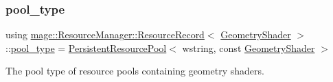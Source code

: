 \subsubsection{\texorpdfstring{pool\+\_\+type}{pool\_type}}
{\footnotesize\ttfamily using \hyperlink{structmage_1_1_resource_manager_1_1_resource_record}{mage\+::\+Resource\+Manager\+::\+Resource\+Record}$<$ \hyperlink{namespacemage_a0cf0bb4b74903e78658c96412d5687a6}{Geometry\+Shader} $>$\+::\hyperlink{structmage_1_1_resource_manager_1_1_resource_record_3_01_geometry_shader_01_4_a9ae3385e1d14f1541b1a8cc95263c796}{pool\+\_\+type} =  \hyperlink{classmage_1_1_persistent_resource_pool}{Persistent\+Resource\+Pool}$<$ wstring, const \hyperlink{namespacemage_a0cf0bb4b74903e78658c96412d5687a6}{Geometry\+Shader} $>$}

The pool type of resource pools containing geometry shaders. 